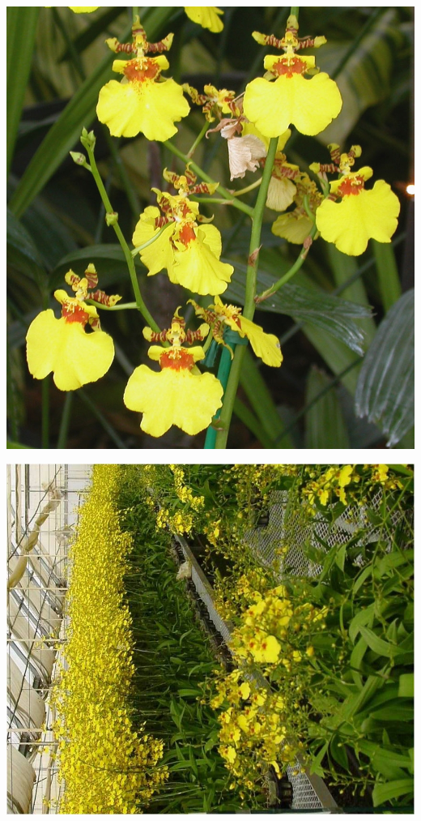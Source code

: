 \documentclass{article}
\begin{document}
\begin{center}
\includegraphics[height=0.925\paperheight]{../Orchid_Oncidium2.jpg}
\end{center}
\newpage

\begin{center}
\includegraphics[height=0.925\paperheight]{../Orchid_Oncidium_Plant.jpg}
\end{center}
\newpage
\end{document}
